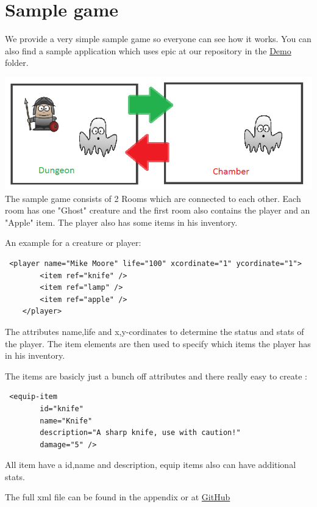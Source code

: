 \chapter{Sample game}

We provide a very simple sample game so everyone can see how it works.  You can also find a sample application which uses epic at our repository in the \href{https://github.com/kerko/epic/blob/dev/project/demo}{Demo} folder.

\includegraphics[scale=0.75]{assets/SampleGame.png}
 The sample game consists of 2 Rooms which are connected to each other. Each room has one "Ghost" creature and the first room also contains the player and an "Apple" item.  The player also has some items in his inventory.
 
 An example for a creature or player:
 \begin{verbatim}
 <player name="Mike Moore" life="100" xcordinate="1" ycordinate="1">
        <item ref="knife" />
        <item ref="lamp" />
        <item ref="apple" />
    </player>
 \end{verbatim}
 The  attributes name,life and x,y-cordinates to determine the status and stats of the player.
 The item elements are then used to specify which items the player has in his inventory.
 
 The items are basicly just a bunch off attributes and there really easy to create :
 \begin{verbatim}
 <equip-item
        id="knife"
        name="Knife"
        description="A sharp knife, use with caution!"
        damage="5" />
 \end{verbatim}
All item have a id,name and description, equip items also can have additional stats.

The full xml file can be found in the appendix or at \href{https://github.com/kerko/epic/blob/dev/project/demo/demo.xml}{GitHub}